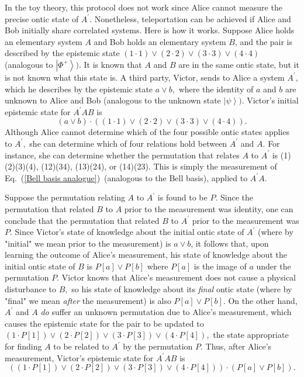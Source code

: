 \documentclass[pra,twocolumn,nofootinbib,showpacs]{revtex4}
\begin{document}
In the toy theory, this protocol does not work since Alice cannot measure
the precise ontic state of $A^{\prime }$. Nonetheless, teleportation can be
achieved if Alice and Bob initially share correlated systems. Here is how it
works. Suppose Alice holds an elementary system $A$ and Bob holds an
elementary system $B$, and the pair is described by the epistemic state $%
(1\cdot 1)\vee (2\cdot 2)\vee (3\cdot 3)\vee (4\cdot 4)$ (analogous to $%
\left| \Phi ^{+}\right\rangle ).$ It is known that $A$ and $B$ are in the
same ontic state, but it is not known what this state is. A third party,
Victor, sends to Alice a system $A^{\prime },$ which he describes by the
epistemic state $a\vee b,$ where the identity of $a$ and $b$ are unknown to
Alice and Bob (analogous to the unknown state $\left| \psi \right\rangle )$.
Victor's initial epistemic state for $A^{\prime }AB$ is
\begin{equation}
(a\vee b)\cdot \left( (1\cdot 1)\vee (2\cdot 2)\vee (3\cdot 3)\vee (4\cdot
4)\right) .
\end{equation}
Although Alice cannot determine which of the four possible ontic states
applies to $A^{\prime },$ she can determine which of four relations hold
between $A^{\prime }$ and $A.$ For instance, she can determine whether the
permutation that relates $A$ to $A^{\prime }$ is (1)(2)(3)(4), (12)(34),
(13)(24), or (14)(23). This is simply the measurement of Eq.~(\ref{Bell
basis analogue})~(analogous to the Bell basis), applied to $A^{\prime }A.$

Suppose the permutation relating $A$ to $A^{\prime }$ is found to be $P.$
Since the permutation that related $B$ to $A$ prior to the measurement was
identity, one can conclude that the permutation that related $B$ to $%
A^{\prime }$ prior to the measurement was $P.$ Since Victor's state of
knowledge about the initial ontic state of $A^{\prime }$ (where by "initial"
we mean prior to the measurement) is $a\vee b$, it follows that, upon
learning the outcome of Alice's measurement, his state of knowledge about
the initial ontic state of $B$ is $P[a]\vee P[b]$ where $P[a]$ is the image
of $a$ under the permutation $P.$ Victor knows that Alice's measurement does
not cause a physical disturbance to $B,$ so his state of knowledge about its
\emph{final} ontic state (where by "final" we mean \emph{after }the
measurement) is also $P[a]\vee P[b].$ On the other hand, $A^{\prime }$ and $A
$ \emph{do} suffer an unknown permutation due to Alice's measurement, which
causes the epistemic state for the pair to be updated to $(1\cdot P[1])\vee
(2\cdot P[2])\vee (3\cdot P[3])\vee (4\cdot P[4]),$ the state appropriate
for finding $A$ to be related to $A^{\prime }$ by the permutation $P.$ Thus,
after Alice's measurement, Victor's epistemic state for $A^{\prime }AB$ is
\begin{equation*}
((1\cdot P[1])\vee (2\cdot P[2])\vee (3\cdot P[3])\vee (4\cdot P[4]))\cdot
(P[a]\vee P[b]).
\end{equation*}
\end{document}
